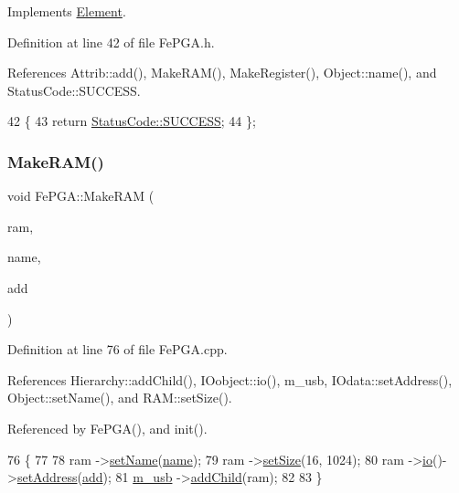 Implements \hyperlink{classElement_af42754b5cabc198869222725218d695c}{Element}.



Definition at line 42 of file Fe\+P\+G\+A.\+h.



References Attrib\+::add(), Make\+R\+A\+M(), Make\+Register(), Object\+::name(), and Status\+Code\+::\+S\+U\+C\+C\+E\+SS.


\begin{DoxyCode}
42                     \{
43     \textcolor{keywordflow}{return} \hyperlink{classStatusCode_a6f565cbeadc76d14c72f047e5e85eb4badd0da38d3ba0d922efd1f4619bc37ad8}{StatusCode::SUCCESS};
44   \};
\end{DoxyCode}
\mbox{\label{classFePGA_ac3af50fbe7f8f7a8c6adbcb164cbbf47}} 
\subsubsection{\texorpdfstring{Make\+R\+A\+M()}{MakeRAM()}}
{\footnotesize\ttfamily void Fe\+P\+G\+A\+::\+Make\+R\+AM (\begin{DoxyParamCaption}\item[{\hyperlink{classRAM}{R\+AM} $\ast$}]{ram,  }\item[{std\+::string}]{name,  }\item[{unsigned int}]{add }\end{DoxyParamCaption})}



Definition at line 76 of file Fe\+P\+G\+A.\+cpp.



References Hierarchy\+::add\+Child(), I\+Oobject\+::io(), m\+\_\+usb, I\+Odata\+::set\+Address(), Object\+::set\+Name(), and R\+A\+M\+::set\+Size().



Referenced by Fe\+P\+G\+A(), and init().


\begin{DoxyCode}
76                                                              \{
77 
78   ram   ->\hyperlink{classObject_ae30fea75683c2d149b6b6d17c09ecd0c}{setName}(\hyperlink{classObject_a300f4c05dd468c7bb8b3c968868443c1}{name});
79   ram   ->\hyperlink{classRAM_adcf2ebb12f1a3e833ce7d5a33670c29d}{setSize}(16, 1024);        
80   ram   ->\hyperlink{classIOobject_af04fb94137c3d86849f478ac5afab5d1}{io}()->\hyperlink{classIOdata_af98cbfbc28346ebb9b64ca0203af1463}{setAddress}(\hyperlink{classAttrib_a235f773af19c900264a190b00a3b4ad7}{add});
81   \hyperlink{classFePGA_afb7947e600a66d914ee524acec3d8b1f}{m\_usb} ->\hyperlink{classHierarchy_ad677774ff38fcb257c04a3a10d471fac}{addChild}(ram);
82 
83 \}
\end{DoxyCode}
\mbox{\label{classFePGA_aa58fc0a09d8efa7abc2766bf5bb67327}} 
